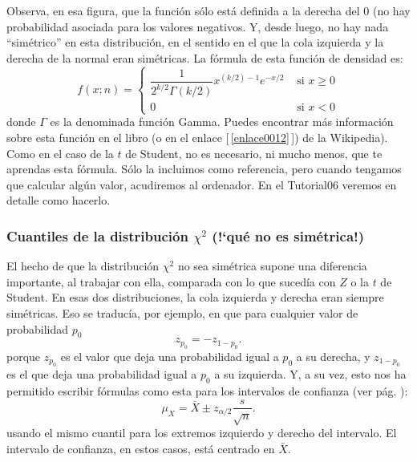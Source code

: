 Observa, en esa figura, que la función sólo está definida a la
derecha del $0$ (no hay probabilidad asociada para los valores negativos. Y,
desde luego, no hay nada ``simétrico'' en esta distribución, en el sentido en
el que la cola izquierda y la derecha de la normal eran simétricas. La fórmula
de esta función de densidad es:
         \[f(x;n)=
         \begin{cases}
         \dfrac{1}{2^{k/2}\Gamma(k/2)}x^{(k/2)-1}e^{-x/2}&\mbox{ si }x\geq 0\\
         0&\mbox{ si }x<0
         \end{cases}
         \]
donde $\Gamma$ es la denominada {\sf función Gamma}. Puedes encontrar más información sobre esta función en el libro \cite{garcia2009estadistica} (o en el enlace [\,\ref{enlace0012}\,]\label{enlace0012a}) de la Wikipedia). Como en el caso de la $t$ de Student, no es necesario, ni mucho menos, que te aprendas esta
fórmula. Sólo la incluimos como referencia, pero cuando tengamos que calcular algún valor,
acudiremos al ordenador. En el Tutorial06 veremos en detalle como hacerlo.

\subsubsection{Cuantiles de la distribución $\chi^2$ ({!`}qué no es simétrica!)}\label{cap07:subsubsec:ChiCudadradoNoEsSimetrica}

El hecho de que la distribución $\chi^2$ no sea simétrica supone una diferencia
importante, al trabajar con ella, comparada con lo que sucedía con $Z$ o la $t$
de Student. En esas dos distribuciones, la cola izquierda y derecha eran
siempre simétricas. Eso se traducía, por ejemplo, en que para cualquier valor
de probabilidad $p_0$
\[z_{p_0}=-z_{1-p_0}.\]
porque $z_{p_0}$ es el valor que deja una probabilidad igual a $p_0$ a su
derecha, y $z_{1-p_0}$ es el que deja una probabilidad igual a $p_0$ a su
izquierda. Y, a su vez, esto nos ha permitido escribir fórmulas como esta para
los intervalos de confianza (ver pág.
\pageref{cap06:ecu:IntervaloConfianzaMediaMuestraGrande}):
\[\mu_X =\bar X \pm z_{\alpha/2}\dfrac{s}{\sqrt{n}}.\]
usando el mismo cuantil para los extremos izquierdo y derecho del intervalo. El
intervalo de confianza, en estos casos, está centrado en $\bar X$.

